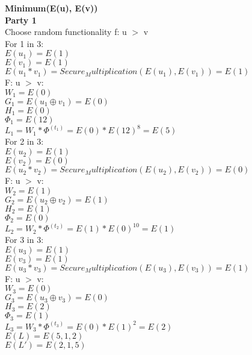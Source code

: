 \documentclass[10pt]{article} %
\begin{document}
\textbf{Minimum(E(u), E(v))} \\
\textbf{Party 1} \\
Choose random functionality f: u $>$ v \\
For 1 in 3: \\
\indent $E(u_1) = E(1)$ \\
\indent $E(v_1) = E(1)$ \\
\indent $E(u_1 * v_1) =  Secure_Multiplication(E(u_1), E(v_1)) = E(1)$ \\
\indent F: u $>$ v: \\
\indent \indent $W_1 = E(0)$ \\
\indent $G_1 = E(u_1 \oplus v_1) = E(0)$ \\
\indent $H_1 = E(0)$ \\
\indent $\Phi_1 = E(12)$ \\
\indent $L_1 = W_1 * \Phi^(t_1) = E(0) * E(12)^8 = E(5)$ \\
For 2 in 3: \\
\indent $E(u_2) = E(1)$ \\
\indent $E(v_2) = E(0)$ \\
\indent $E(u_2 * v_2) = Secure_Multiplication(E(u_2), E(v_2)) = E(0)$ \\
\indent F: u $>$ v: \\
\indent \indent $W_2 = E(1)$ \\
\indent $G_2 = E(u_2 \oplus v_2) = E(1)$ \\
\indent $H_2 = E(1)$ \\
\indent $\Phi_2 = E(0)$ \\
\indent $L_2 = W_2 * \Phi^(t_2) = E(1) * E(0)^{10} = E(1)$ \\
For 3 in 3: \\
\indent $E(u_3) = E(1)$ \\
\indent $E(v_3) = E(1)$ \\
\indent $E(u_3 * v_3) = Secure_Multiplication(E(u_3), E(v_3)) = E(1)$ \\
\indent F: u $>$ v: \\
\indent \indent $W_3 = E(0)$ \\
\indent $G_3 = E(u_3 \oplus v_3) = E(0)$ \\
\indent $H_3 = E(2)$ \\
\indent $\Phi_3 = E(1)$ \\
\indent $L_3 = W_3 * \Phi^(t_3) = E(0) * E(1)^{2} = E(2)$ \\
$E(L) = E(5, 1, 2)$ \\
$E(L') = E(2, 1, 5)$ \\ \\
\end{document}
